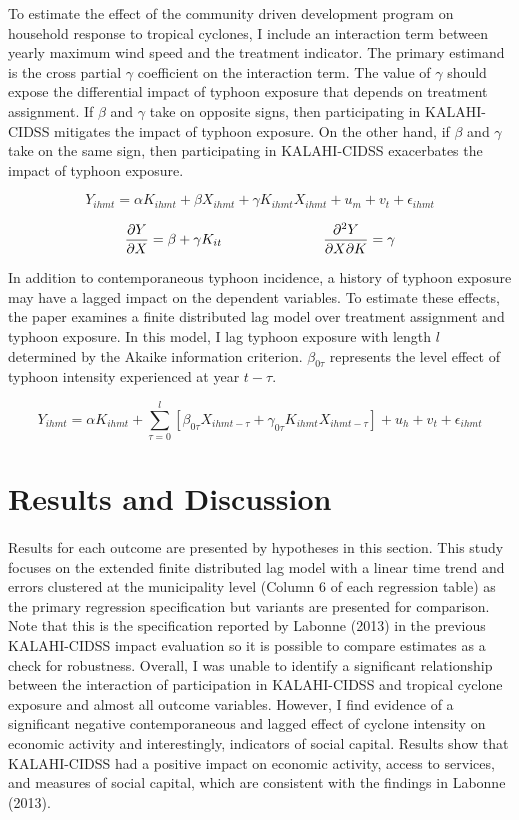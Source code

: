 \documentclass[12pt]{article}
\begin{document}
	To estimate the effect of the community driven development program on household response to tropical cyclones, I include an interaction term between yearly maximum wind speed and the treatment indicator. The primary estimand is the cross partial $\gamma$ coefficient on the interaction term. The value of $\gamma$ should expose the differential impact of typhoon exposure that depends on treatment assignment. If $\beta$ and $\gamma$ take on opposite signs, then participating in KALAHI-CIDSS mitigates the impact of typhoon exposure. On the other hand, if $\beta$ and $\gamma$ take on the same sign, then participating in KALAHI-CIDSS exacerbates the impact of typhoon exposure. 

	\[Y_{ihmt} = \alpha K_{ihmt} + \beta X_{ihmt} + \gamma K_{ihmt} X_{ihmt} + u_{m} + v_{t} + \epsilon_{ihmt}\] 

	\[\frac{\partial Y}{\partial X} = \beta + \gamma K_{it} \hspace{1 in} \frac{\partial^2 Y}{\partial X \partial K} = \gamma\] 

	In addition to contemporaneous typhoon incidence, a history of typhoon exposure may have a lagged impact on the dependent variables. To estimate these effects, the paper examines a finite distributed lag model over treatment assignment and typhoon exposure. In this model, I lag typhoon exposure with length $l$ determined by the Akaike information criterion. $\beta_{0\tau}$ represents the level effect of typhoon intensity experienced at year $t - \tau$. 

	\[Y_{ihmt} = \alpha K_{ihmt} +
				\sum_{\tau = 0}^{l} \left[\beta_{0\tau} X_{ihmt - \tau} + 
				\gamma_{0\tau} K_{ihmt} X_{ihmt - \tau} \right] + 
				u_{h} + 
				v_{t} + 
				\epsilon_{ihmt}\]

\section{Results and Discussion} 

	\paragraph{ } Results for each outcome are presented by hypotheses in this section. This study focuses on the extended finite distributed lag model with a linear time trend and errors clustered at the municipality level (Column 6 of each regression table) as the primary regression specification but variants are presented for comparison. Note that this is the specification reported by Labonne (2013) in the previous KALAHI-CIDSS impact evaluation so it is possible to compare estimates as a check for robustness. Overall, I was unable to identify a significant relationship between the interaction of participation in KALAHI-CIDSS and tropical cyclone exposure and almost all outcome variables. However, I find evidence of a significant negative contemporaneous and lagged effect of cyclone intensity on economic activity and interestingly, indicators of social capital. Results show that KALAHI-CIDSS had a positive impact on economic activity, access to services, and measures of social capital, which are consistent with the findings in Labonne (2013).
\end{document}
